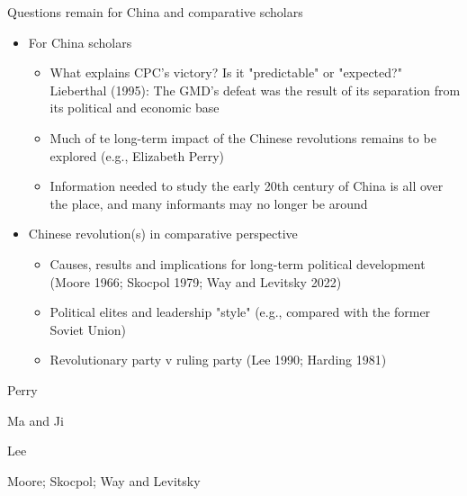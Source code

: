 \documentclass[
  10pt,
  ignorenonframetext,
]{beamer}
\begin{document}
\begin{frame}{Questions remain for China and comparative scholars}
\label{questions-remain-for-china-and-comparative-scholars}
\begin{itemize}
\small
  \item For China scholars
  \vpsace{0.1cm}
  \begin{itemize}
    \item What explains CPC's victory? Is it "predictable" or "expected?" Lieberthal (1995): The GMD's defeat was the result of its separation from its political and economic base
    \item Much of te long-term impact of the Chinese revolutions remains to be explored (e.g., Elizabeth Perry)
    \item Information needed to study the early 20th century of China is all over the place, and many informants may no longer be around
  \end{itemize}
  \vpsace{0.3cm}
  \item Chinese revolution(s) in comparative perspective
  \vpsace{0.1cm}
  \begin{itemize}
    \item Causes, results and implications for long-term political development (Moore 1966; Skocpol 1979; Way and Levitsky 2022)
    \item Political elites and leadership "style" (e.g., compared with the former Soviet Union)
    \item Revolutionary party v ruling party (Lee 1990; Harding 1981)
  \end{itemize}  
\end{itemize}
\end{frame}

\begin{frame}
Perry
\end{frame}

\begin{frame}
Ma and Ji
\end{frame}

\begin{frame}
Lee
\end{frame}

\begin{frame}
Moore; Skocpol; Way and Levitsky
\end{frame}
\end{document}
